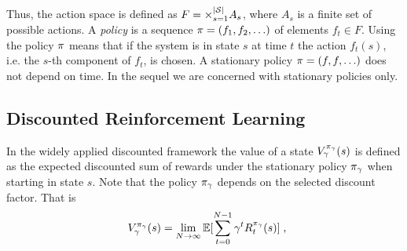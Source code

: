 \documentclass[envcountsame]{llncs}
\begin{document}
Thus, the action space is defined as \(F = \times_{s=1}^{\lvert{\mathcal{S}}\rvert} A_{s}\), where \(A_{s}\) is
a finite set of possible actions. A \emph{policy} is a sequence \(\pi = (f_{1},f_{2},\ldots)\) of
elements \(f_{t} \in F\). Using the policy \(\pi\) means that if the system is in state \(s\) at
time \(t\) the action \(f_{t}(s)\), i.e.%
the \(s\)-th component of \(f_{t}\), is chosen. A stationary policy \(\pi = (f,f,\ldots)\) does not
depend on time. In the sequel we are concerned with stationary policies only.


\subsection{Discounted Reinforcement Learning}
\label{subsec:Discounted_Reinforcement_Learning}


In the widely applied discounted framework the value of a state \(V_{\gamma}^{\pi_{\gamma}}(s)\) is
defined as the expected discounted sum of rewards under the stationary policy \(\pi_{\gamma}\) when
starting in state \(s\). Note that the policy \(\pi_{\gamma}\) depends on the selected discount
factor. That is
\begin{align*}
  V_{\gamma}^{\pol_{\gamma}}(s)=\lim_{N \to \infty} \E[\sum_{t=0}^{N-1} \gamma^{t} R_{t}^{\pol_{\gamma}}(s)]\tcom
\end{align*}
\end{document}

